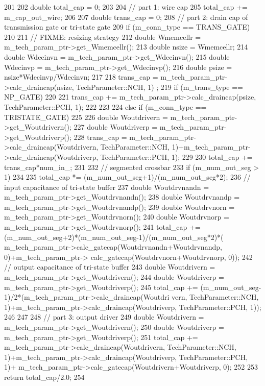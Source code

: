 \begin{DoxyCode}
201 {
202     double total_cap = 0;
203 
204     // part 1: wire cap
205     total_cap += m_cap_out_wire;
206 
207     double trans_cap = 0;
208     // part 2: drain cap of transmission gate or tri-state gate
209     if (m_conn_type == TRANS_GATE)
210     {
211         // FIXME: resizing strategy
212         double Wmemcellr = m_tech_param_ptr->get_Wmemcellr();
213         double nsize = Wmemcellr;
214         double Wdecinvn = m_tech_param_ptr->get_Wdecinvn();
215         double Wdecinvp = m_tech_param_ptr->get_Wdecinvp();
216         double psize = nsize*Wdecinvp/Wdecinvn;
217 
218         trans_cap = m_tech_param_ptr->calc_draincap(nsize, TechParameter::NCH, 1)
      ;
219         if (m_trans_type == NP_GATE)
220         {
221             trans_cap += m_tech_param_ptr->calc_draincap(psize, 
      TechParameter::PCH, 1);
222         }
223     }
224     else if (m_conn_type == TRISTATE_GATE)
225     {
226         double Woutdrivern = m_tech_param_ptr->get_Woutdrivern();
227         double Woutdriverp = m_tech_param_ptr->get_Woutdriverp();
228         trans_cap = m_tech_param_ptr->calc_draincap(Woutdrivern, 
      TechParameter::NCH, 1)+m_tech_param_ptr->calc_draincap(Woutdriverp, 
      TechParameter::PCH, 1);
229     }
230     total_cap += trans_cap*num_in_;
231 
232     // segmented crossbar
233     if (m_num_out_seg > 1)
234     {
235         total_cap *= (m_num_out_seg+1)/(m_num_out_seg*2);
236         // input capacitance of tri-state buffer
237         double Woutdrvnandn = m_tech_param_ptr->get_Woutdrvnandn();
238         double Woutdrvnandp = m_tech_param_ptr->get_Woutdrvnandp();
239         double Woutdrvnorn = m_tech_param_ptr->get_Woutdrvnorn();
240         double Woutdrvnorp = m_tech_param_ptr->get_Woutdrvnorp();
241         total_cap += (m_num_out_seg+2)*(m_num_out_seg-1)/(m_num_out_seg*2)*(
      m_tech_param_ptr->calc_gatecap(Woutdrvnandn+Woutdrvnandp, 0)+m_tech_param_ptr->
      calc_gatecap(Woutdrvnorn+Woutdrvnorp, 0));
242         // output capacitance of tri-state buffer
243         double Woutdrivern = m_tech_param_ptr->get_Woutdrivern();
244         double Woutdriverp = m_tech_param_ptr->get_Woutdriverp();
245         total_cap += (m_num_out_seg-1)/2*(m_tech_param_ptr->calc_draincap(Woutdri
      vern, TechParameter::NCH, 1)+m_tech_param_ptr->calc_draincap(Woutdriverp, 
      TechParameter::PCH, 1));
246     }
247 
248     // part 3: output driver
249     double Woutdrivern = m_tech_param_ptr->get_Woutdrivern();
250     double Woutdriverp = m_tech_param_ptr->get_Woutdriverp();
251     total_cap += m_tech_param_ptr->calc_draincap(Woutdrivern, TechParameter::NCH,
       1)+m_tech_param_ptr->calc_draincap(Woutdriverp, TechParameter::PCH, 1)+
      m_tech_param_ptr->calc_gatecap(Woutdrivern+Woutdriverp, 0);
252 
253     return total_cap/2.0;
254 }
\end{DoxyCode}
